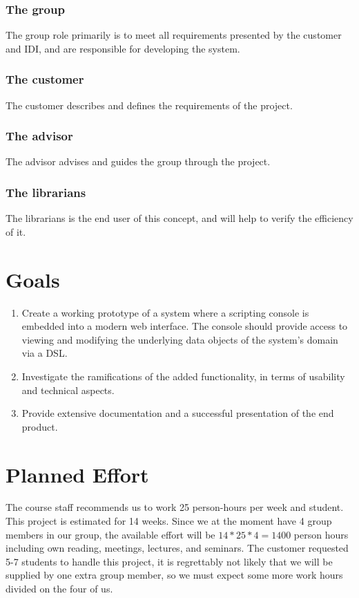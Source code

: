 \subsubsection[]{The group}
The group role primarily is to meet all requirements presented by the customer and IDI, and are responsible for developing the system.

\subsubsection[]{The customer}
The customer describes and defines the requirements of the project. 

\subsubsection[]{The advisor}
The advisor advises and guides the group through the project.

\subsubsection[]{The librarians}
The librarians is the end user of this concept, and will help to verify the efficiency of it.



\section{Goals}
\begin{enumerate}
  \item Create a working prototype of a system where a scripting console is embedded into a modern web interface. The console should provide access to viewing and modifying the underlying data objects of the system's domain via a DSL.
  \item Investigate the ramifications of the added functionality, in terms of usability and technical aspects.
  \item Provide extensive documentation and a successful presentation of the end product.
\end{enumerate}

\section{Planned Effort}
The course staff recommends us to work 25 person-hours per week and student. This project is estimated for 14 weeks. Since we at the moment have 4 group members in our group, the available effort will be $14*25*4=1400$ person hours including own reading, meetings, lectures, and seminars. The customer requested 5-7 students to handle this project, it is regrettably not likely that we will be supplied by one extra group member, so we must expect some more work hours divided on the four of us.

